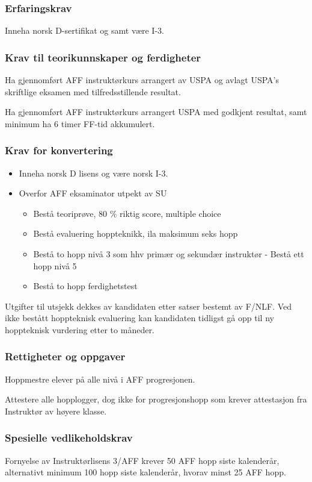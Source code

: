 \subsubsection{Erfaringskrav}
Inneha norsk D-sertifikat og samt være I-3.

\subsubsection{Krav til teorikunnskaper og ferdigheter}
Ha gjennomført AFF instruktørkurs arrangert av USPA og avlagt USPA’s skriftlige eksamen med tilfredsstillende resultat.

Ha gjennomført AFF instruktørkurs arrangert USPA med godkjent resultat, samt minimum ha 6 timer FF-tid akkumulert.

\subsubsection{Krav for konvertering}
\begin{itemize}
	\item Inneha norsk D lisens og være norsk I-3.
	\item Overfor AFF eksaminator utpekt av SU
	\begin{itemize}
		\item Bestå teoriprøve, 80 \% riktig score, multiple choice
		\item Bestå evaluering hoppteknikk, ila maksimum seks hopp
		\item Bestå to hopp nivå 3 som hhv primær og sekundær instruktør - Bestå ett hopp nivå 5
		\item Bestå to hopp ferdighetstest
	\end{itemize}
\end{itemize}

Utgifter til utsjekk dekkes av kandidaten etter satser bestemt av F/NLF. Ved ikke bestått hoppteknisk evaluering kan kandidaten tidligst gå opp til ny hoppteknisk vurdering etter to måneder.

\subsubsection{Rettigheter og oppgaver}
Hoppmestre elever på alle nivå i AFF progresjonen.

Attestere alle hopplogger, dog ikke for progresjonshopp som krever attestasjon fra Instruktør av høyere klasse.

\subsubsection{Spesielle vedlikeholdskrav}
Fornyelse av Instruktørlisens 3/AFF krever 50 AFF hopp siste kalenderår, alternativt minimum 100 hopp siste kalenderår, hvorav minst 25 AFF hopp.


